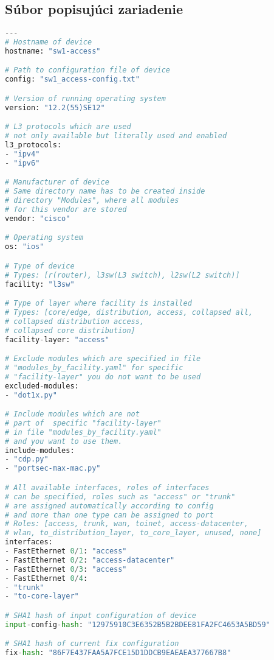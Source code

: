 \subsection{Súbor popisujúci zariadenie}
\begin{lstlisting}[frame=single,numbers=right,caption={Konfiguračný súbor device.yaml ktorý popisuje základné informácie o jednom konkrétnom zariadení},label=lst:lldp,basicstyle=\ttfamily\small, keywordstyle=\color{black},language=python,breaklines=true]
---
# Hostname of device
hostname: "sw1-access"

# Path to configuration file of device
config: "sw1_access-config.txt"

# Version of running operating system
version: "12.2(55)SE12"

# L3 protocols which are used 
# not only available but literally used and enabled
l3_protocols:
- "ipv4"
- "ipv6"

# Manufacturer of device
# Same directory name has to be created inside 
# directory "Modules", where all modules 
# for this vendor are stored
vendor: "cisco"

# Operating system
os: "ios"

# Type of device
# Types: [r(router), l3sw(L3 switch), l2sw(L2 switch)]
facility: "l3sw"

# Type of layer where facility is installed
# Types: [core/edge, distribution, access, collapsed all, 
# collapsed distribution access, 
# collapsed core distribution]
facility-layer: "access"

# Exclude modules which are specified in file 
# "modules_by_facility.yaml" for specific 
# "facility-layer" you do not want to be used
excluded-modules:
- "dot1x.py"

# Include modules which are not 
# part of  specific "facility-layer"
# in file "modules_by_facility.yaml" 
# and you want to use them.
include-modules: 
- "cdp.py"
- "portsec-max-mac.py"

# All available interfaces, roles of interfaces
# can be specified, roles such as "access" or "trunk"
# are assigned automatically according to config 
# and more than one type can be assigned to port
# Roles: [access, trunk, wan, toinet, access-datacenter,
# wlan, to_distribution_layer, to_core_layer, unused, none]   
interfaces:
- FastEthernet 0/1: "access"
- FastEthernet 0/2: "access-datacenter"
- FastEthernet 0/3: "access"
- FastEthernet 0/4: 
- "trunk"
- "to-core-layer"

# SHA1 hash of input configuration of device
input-config-hash: "12975910C3E6352B5B2BDEE81FA2FC4653A5BD59"

# SHA1 hash of current fix configuration 
fix-hash: "86F7E437FAA5A7FCE15D1DDCB9EAEAEA377667B8"

\end{lstlisting}

